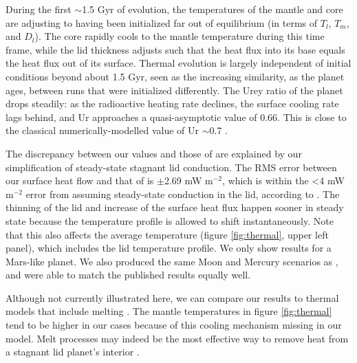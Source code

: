 During the first $\sim$1.5 Gyr of evolution, the temperatures of the mantle and core are adjusting to having been initialized far out of equilibrium (in terms of $T_l$, $T_m$, and $D_l$). The core rapidly cools to the mantle temperature during this time frame, while the lid thickness adjusts such that the heat flux into its base equals the heat flux out of its surface. Thermal evolution is largely independent of initial conditions beyond about 1.5 Gyr, seen as the increasing similarity, as the planet ages, between runs that were initialized differently. The Urey ratio of the planet drops steadily: as the radioactive heating rate declines, the surface cooling rate lags behind, and Ur approaches a quasi-asymptotic value of 0.66. This is close to the classical numerically-modelled value of Ur $\sim$0.7 \citep{Schubert1980, McKenzie1981}.


The discrepancy between our values and those of \citet{Thiriet2019} are explained by our simplification of steady-state stagnant lid conduction. The RMS error between our surface heat flow and that of  \citet{Thiriet2019} is $\pm$2.69 mW m$^{-2}$, which is within the \textless4 mW m$^{-2}$ error from assuming steady-state conduction in the lid, according to \citet{Thiriet2019}. The thinning of the lid and increase of the surface heat flux happen sooner in steady state because the temperature profile is allowed to shift instantaneously. Note that this also affects the average temperature (figure \ref{fig:thermal}, upper left panel), which includes the lid temperature profile. We only show results for a Mars-like planet. We also produced the same Moon and Mercury scenarios as \citet{Thiriet2019}, and were able to match the published results equally well.  



Although not currently illustrated here, we can compare our results to thermal models that include melting \citep[e.g.,][]{Hauck2002, Kite2009}. The mantle temperatures in figure \ref{fig:thermal} tend to be higher in our cases because of this cooling mechanism missing in our model. Melt processes may indeed be the most effective way to remove heat from a stagnant lid planet's interior \citep{Armann2012}.

